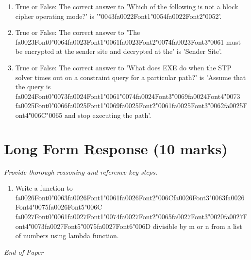 \documentclass[12pt]{article}
\begin{document}
\begin{enumerate}[label=\arabic*.]
\item True or False: The correct answer to 'Which of the following is not a block cipher operating mode?' is '{\char"0043}{\csname fa0022Font1\endcsname\char"0054}{\csname fa0022Font2\endcsname\char"0052}'.
\item True or False: The correct answer to 'The {\csname fa0023Font0\endcsname\char"0064}{\csname fa0023Font1\endcsname\char"0061}{\csname fa0023Font2\endcsname\char"0074}{\csname fa0023Font3\endcsname\char"0061} must be encrypted at the sender site and decrypted at the' is 'Sender Site'.
\item True or False: The correct answer to 'What does EXE do when the STP solver times out on a constraint query for a particular path?' is 'Assume that the query is {\csname fa0024Font0\endcsname\char"0073}{\csname fa0024Font1\endcsname\char"0061}{\char"0074}{\csname fa0024Font3\endcsname\char"0069}{\csname fa0024Font4\endcsname\char"0073} {\csname fa0025Font0\endcsname\char"0066}{\csname fa0025Font1\endcsname\char"0069}{\csname fa0025Font2\endcsname\char"0061}{\csname fa0025Font3\endcsname\char"0062}{\csname fa0025Font4\endcsname\char"006C}{\char"0065} and stop executing the path'.
\end{enumerate}

\section*{Long Form Response (10 marks)}
\textit{Provide thorough reasoning and reference key steps.}
\begin{enumerate}[label=\arabic*.]
\item Write a function to {\csname fa0026Font0\endcsname\char"0063}{\csname fa0026Font1\endcsname\char"0061}{\csname fa0026Font2\endcsname\char"006C}{\csname fa0026Font3\endcsname\char"0063}{\csname fa0026Font4\endcsname\char"0075}{\csname fa0026Font5\endcsname\char"006C} {\csname fa0027Font0\endcsname\char"0061}{\csname fa0027Font1\endcsname\char"0074}{\csname fa0027Font2\endcsname\char"0065}{\csname fa0027Font3\endcsname\char"0020}{\csname fa0027Font4\endcsname\char"0073}{\csname fa0027Font5\endcsname\char"0075}{\csname fa0027Font6\endcsname\char"006D} divisible by m or n from a list of numbers using lambda
function.
\end{enumerate}

\vfill
\noindent\textit{End of Paper}
\end{document}
